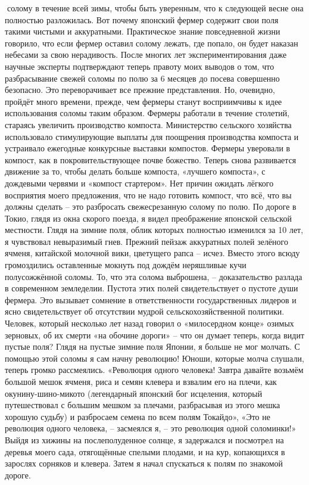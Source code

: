 \documentclass[a4paper]{book}
\begin{document}
солому в течение всей зимы, чтобы быть уверенным, что к следующей весне она полностью
разложилась. Вот почему японский фермер содержит свои поля такими чистыми и
аккуратными. Практическое знание повседневной жизни говорило, что если фермер оставил
солому лежать, где попало, он будет наказан небесами за свою нерадивость.
После многих лет экспериментирования даже научные эксперты подтверждают теперь
правоту моих выводов о том, что разбрасывание свежей соломы по полю за 6 месяцев до
посева совершенно безопасно. Это переворачивает все прежние представления. Но,
очевидно, пройдёт много времени, прежде, чем фермеры станут восприимчивы к идее
использования соломы таким образом.
Фермеры работали в течение столетий, стараясь увеличить производство компоста.
Министерство сельского хозяйства использовало стимулирующие выплаты для поощрения
производства компоста и устраивало ежегодные конкурсные выставки компостов. Фермеры
уверовали в компост, как в покровительствующее почве божество. Теперь снова развивается
движение за то, чтобы делать больше компоста, «лучшего компоста», с дождевыми червями
и «компост стартером». Нет причин ожидать лёгкого восприятия моего предложения, что не
надо готовить компост, что всё, что вы должны сделать – это разбросать свежесрезанную
солому по полю.
По дороге в Токио, глядя из окна скорого поезда, я видел преображение японской
сельской местности. Глядя на зимние поля, облик которых полностью изменился за 10 лет, я
чувствовал невыразимый гнев. Прежний пейзаж аккуратных полей зелёного ячменя,
китайской молочной вики, цветущего рапса – исчез. Вместо этого всюду громоздились
оставленные мокнуть под дождём неряшливые кучи полусожжённой соломы. То, что эта
солома выброшена, – доказательство разлада в современном земледелии. Пустота этих полей
свидетельствует о пустоте души фермера. Это вызывает сомнение в ответственности
государственных
лидеров
и
ясно
свидетельствует
об
отсутствии
мудрой
сельскохозяйственной политики.
Человек, который несколько лет назад говорил о «милосердном конце» озимых
зерновых, об их смерти «на обочине дороги» – что он думает теперь, когда видит пустые
поля? Глядя на пустые зимние поля Японии, я больше не мог молчать. С помощью этой
соломы я сам начну революцию!
Юноши, которые молча слушали, теперь громко рассмеялись. «Революция одного
человека! Завтра давайте возьмём большой мешок ячменя, риса и семян клевера и взвалим
его на плечи, как окунину-шино-микото (легендарный японский бог исцеления, который
путешествовал с большим мешком за плечами, разбрасывая из этого мешка хорошую судьбу)
и разбросаем семена по всем полям Токайдо»,
«Это не революция одного человека, – засмеялся я, – это революция одной соломинки!»
Выйдя из хижины на послеполуденное солнце, я задержался и посмотрел на деревья
моего сада, отягощённые спелыми плодами, и на кур, копающихся в зарослях сорняков и
клевера. Затем я начал спускаться к полям по знакомой дороге.


\end{document}
